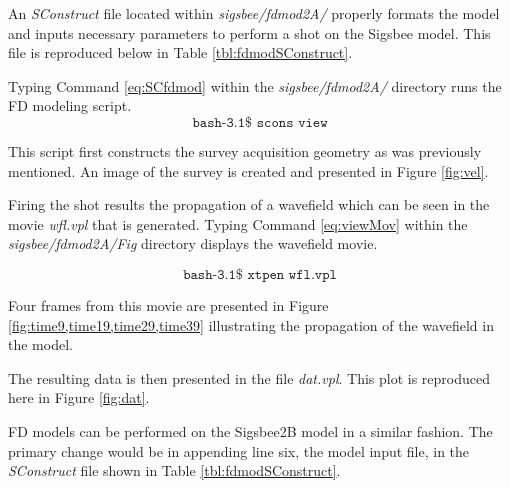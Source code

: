 An \emph{SConstruct} file located within \emph{sigsbee/fdmod2A/} properly formats the model and inputs necessary parameters to perform a shot on
the Sigsbee model.  This file is reproduced below in Table \ref{tbl:fdmodSConstruct}.

{
\tiny

\normalsize
}

Typing Command \ref{eq:SCfdmod} within the \emph{sigsbee/fdmod2A/} directory runs the FD modeling script.
\begin{equation}\label{eq:SCfdmod} \texttt{bash-3.1\$\ scons\ view} \end{equation}

This script first constructs the survey acquisition geometry as was previously mentioned.  An image of the survey is created and presented
in Figure \ref{fig:vel}.


Firing the shot results the propagation of a wavefield which can be seen in the movie \emph{wfl.vpl} that is generated.  Typing
Command \ref{eq:viewMov} within the \emph{sigsbee/fdmod2A/Fig} directory displays the wavefield movie.

\begin{equation}\label{eq:viewMov} \texttt{bash-3.1\$\ xtpen\ wfl.vpl} \end{equation}


Four frames from this movie are presented in Figure \ref{fig:time9,time19,time29,time39}  illustrating the
propagation of the wavefield in the model.



The resulting data is then presented in the file \emph{dat.vpl}.  This plot is reproduced here in Figure \ref{fig:dat}.  



FD models can be performed on the Sigsbee2B model in a similar fashion.  The primary change would be in appending line six, the 
model input file, in the \emph{SConstruct} file shown in Table \ref{tbl:fdmodSConstruct}.    
